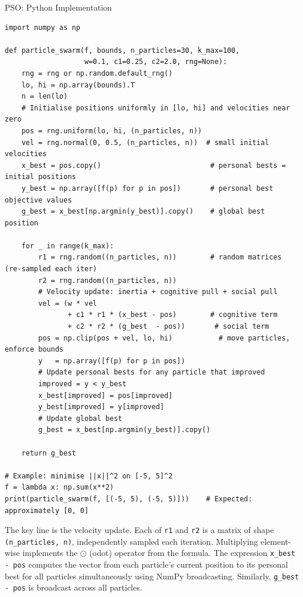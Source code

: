 \documentclass[aspectratio=169,10pt]{beamer}
\begin{document}
\begin{frame}[fragile]{PSO: Python Implementation}
\begin{lstlisting}[style=python, caption={Particle Swarm Optimization (Python / NumPy)}]
import numpy as np

def particle_swarm(f, bounds, n_particles=30, k_max=100,
                   w=0.1, c1=0.25, c2=2.0, rng=None):
    rng = rng or np.random.default_rng()
    lo, hi = np.array(bounds).T
    n = len(lo)
    # Initialise positions uniformly in [lo, hi] and velocities near zero
    pos = rng.uniform(lo, hi, (n_particles, n))
    vel = rng.normal(0, 0.5, (n_particles, n))  # small initial velocities
    x_best = pos.copy()                          # personal bests = initial positions
    y_best = np.array([f(p) for p in pos])       # personal best objective values
    g_best = x_best[np.argmin(y_best)].copy()    # global best position

    for _ in range(k_max):
        r1 = rng.random((n_particles, n))        # random matrices (re-sampled each iter)
        r2 = rng.random((n_particles, n))
        # Velocity update: inertia + cognitive pull + social pull
        vel = (w * vel
               + c1 * r1 * (x_best - pos)        # cognitive term
               + c2 * r2 * (g_best  - pos))       # social term
        pos = np.clip(pos + vel, lo, hi)           # move particles, enforce bounds
        y   = np.array([f(p) for p in pos])
        # Update personal bests for any particle that improved
        improved = y < y_best
        x_best[improved] = pos[improved]
        y_best[improved] = y[improved]
        # Update global best
        g_best = x_best[np.argmin(y_best)].copy()

    return g_best

# Example: minimise ||x||^2 on [-5, 5]^2
f = lambda x: np.sum(x**2)
print(particle_swarm(f, [(-5, 5), (-5, 5)]))    # Expected: approximately [0, 0]
\end{lstlisting}

  The key line is the velocity update.  Each of \texttt{r1} and
  \texttt{r2} is a matrix of shape \texttt{(n\_particles, n)},
  independently sampled each iteration.  Multiplying element-wise
  implements the $\odot$ (odot) operator from the formula.  The
  expression \texttt{x\_best - pos} computes the vector from each
  particle's current position to its personal best for all particles
  simultaneously using NumPy broadcasting.  Similarly,
  \texttt{g\_best - pos} is broadcast across all particles.

\end{frame}
\end{document}
